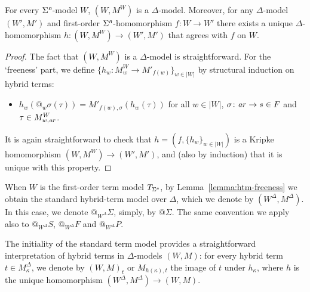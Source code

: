 \documentclass[a4paper,UKenglish,cleveref,autoref]{lipics-v2019}
\begin{document}
\begin{lemma} 
  \label{lemma:htm-freeness}
  For every\/ $\Sigma^{\text{\normalfont\sffamily\itshape n}}$-model\/ $W$, $(W, M^W )$ is a $\Delta$-model.
  Moreover, for any $\Delta$-model $(W', M')$ and first-order\/ $\Sigma^{\text{\normalfont\sffamily\itshape n}}$-homomorphism $f \colon W \to W'$ there exists a unique $\Delta$-homomorphism $h \colon (W, M^W ) \to (W', M')$ that agrees with $f$ on $W$.
\end{lemma}
\begin{proof}
  The fact that $(W, M^W )$ is a $\Delta$-model is straightforward.
  For the `freeness' part, we define $\{ h_{w} \colon M^W _{w} \to M'_{f(w)} \}_{w \in |W|}$ by structural induction on hybrid terms:
  \begin{itemize}
  \item $h_{w}(@_w\sigma(\tau)) = M'_{f(w),\sigma}(h_{w}(\tau))$ for all $w \in |W|$, $\sigma\colon \mathit{a\mkern -1mu r} \to s \in F $ and $\tau \in M^W _{w,\mathit{a\mkern -1mu r}}$.

  \end{itemize}
  It is again straightforward to check that $h = (f, \{ h_{w} \}_{w \in |W|})$ is a Kripke homomorphism $(W, M^W ) \to (W', M')$, and (also by induction) that it is unique with this property.
\end{proof}

When $W$ is the first-order term model $T_{\Sigma^{\text{\normalfont\sffamily\itshape n}}}$, by Lemma~\ref{lemma:htm-freeness} we obtain the standard hybrid-term model over $\Delta$, which we denote by $(W^\Delta, M^\Delta)$.
 In this case, we denote $@_{W^\Delta}\Sigma$, simply, by $@\Sigma$. 
 The same convention we apply also to $@_{W^\Delta}S$, $@_{W^\Delta}F$ and $@_{W^\Delta}P$.
 

 The initiality of the standard term model provides a straightforward interpretation of hybrid terms in $\Delta$-models $(W, M)$: for every hybrid term $t \in M^{\Delta}_{\kappa}$, we denote by $(W, M)_{t}$ or $M_{h(\kappa), t}$ the image of $t$ under $h_{\kappa}$, where $h$ is the unique homomorphism $(W^\Delta, M^\Delta) \to (W, M)$.
 
\end{document}

